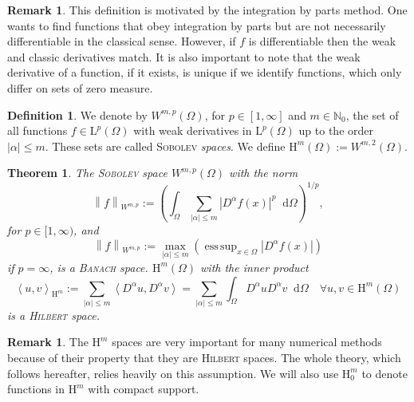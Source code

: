 \documentclass[12pt,a4paper,twoside, open=right]{scrreprt}
\theoremstyle{definition}
\newtheorem{rem}[auf]{Remark}
\newtheorem{defn}[auf]{Definition}
\theoremstyle{plain}
\newtheorem{sa}[auf]{Theorem}
\DeclareMathOperator*{\esssup}{ess\,sup} %
\newcommand{\abs}[1]{\left\vert #1\right\vert}
\newcommand{\dotp}[2]{\left\langle #1,#2\right\rangle}
\newcommand{\nn}{\mathbb{N}}
\newcommand{\norm}[1]{\left\lVert#1\right\rVert}
\newcommand{\D}{\mathop{}\!\mathrm{d}}
\begin{document}
\begin{rem}
    This definition is motivated by the integration by parts method. One wants to find functions that obey integration by parts but are not necessarily differentiable in the classical sense. However, if $f$ is differentiable then the weak and classic derivatives match. It is also important to note that the weak derivative of a function, if it exists, is unique if we identify functions, which only differ on sets of zero measure.
\end{rem}
\begin{defn}
    We denote by $W^{m,p}(\Omega)$, for $p\in[1,\infty]$ and $m\in\nn_0$, the set of all functions $f\in \mathrm{L}^p(\Omega)$ with weak derivatives in $\mathrm{L}^p(\Omega)$ up to the order $\abs{\alpha}\le m$. These sets are called \textsc{Sobolev} \emph{spaces}. We define $\mathrm{H}^m(\Omega):=W^{m,2}(\Omega)$.
\end{defn}
\begin{sa}
    The \textsc{Sobolev} space $W^{m,p}(\Omega)$ with the norm
    \begin{equation}
        \norm{f}_{W^{m,p}}:=\left(\int_\Omega\sum_{\abs{\alpha}\le m}\abs{D^{\alpha} f(x)}^p\D\Omega\right)^{1/p},
    \end{equation}
    for $p\in[1,\infty)$, and 
    \begin{equation}
        \norm{f}_{W^{m,p}}:=\max_{\abs{\alpha}\le m}\left(\esssup_{x\in\Omega}\abs{D^{\alpha}f(x)}\right)
    \end{equation}
    if $p=\infty$, is a \textsc{Banach} space. $\mathrm{H}^m(\Omega)$ with the inner product
    \begin{equation}
        \dotp{u}{v}_{\mathrm{H}^m}:=\sum_{\abs{\alpha}\le m}\dotp{D^{\alpha}u}{D^{\alpha}v}=\sum_{\abs{\alpha}\le m}\int_\Omega D^\alpha u D^\alpha v\D\Omega \quad \forall u,v\in \mathrm{H}^m(\Omega)
    \end{equation}
    is a \textsc{Hilbert} space.
\end{sa}
\begin{rem}
    The $\mathrm{H}^m$ spaces are very important for many numerical methods because of their property that they are \textsc{Hilbert} spaces. The whole theory, which follows hereafter, relies heavily on this assumption. We will also use $\mathrm{H}_0^m$ to denote functions in $\mathrm{H}^m$ with compact support.
\end{rem}
\end{document}
